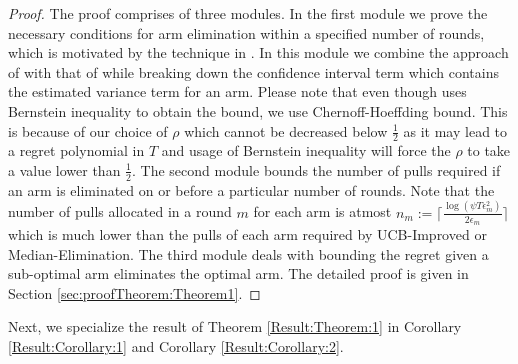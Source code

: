 \begin{proof}
The proof comprises of three modules. In the first module we prove the necessary conditions for arm elimination within a specified number of rounds, which is motivated by the technique in \cite{auer2010ucb}. In this module we combine the approach of \cite{audibert2009exploration} with that of  \cite{auer2010ucb} while breaking down the confidence interval term which contains the estimated variance   term for an arm. Please note that even though \cite{audibert2009exploration} uses Bernstein inequality to obtain the  bound, we use Chernoff-Hoeffding bound. This is because of our choice of $\rho$ which cannot be decreased below $\frac{1}{2}$ as it may lead to a regret polynomial in $T$ and usage of Bernstein inequality will force the $\rho$ to take a value lower than $\frac{1}{2}$. The second module bounds the number of pulls required if an arm is eliminated on or before a particular number of rounds. Note that the number of pulls allocated in a round $m$ for each arm is atmost $n_{m}:=\bigg\lceil\frac{\log{(\psi T\epsilon_{m}^{2})}}{2\epsilon_{m}}\bigg\rceil$ which is much lower than the pulls of each arm required by UCB-Improved or Median-Elimination. The third module deals with bounding the regret given a sub-optimal arm eliminates the optimal arm. The detailed proof is given in Section \ref{sec:proofTheorem:Theorem1}.
\end{proof}
Next, we specialize the result of Theorem \ref{Result:Theorem:1} in Corollary \ref{Result:Corollary:1} and Corollary \ref{Result:Corollary:2}.

